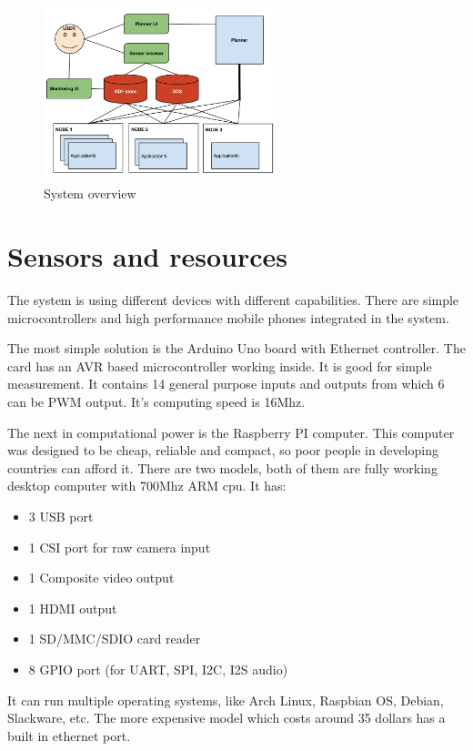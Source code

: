 \begin{figure}[h]
	\centering
	\includegraphics[width=0.6\textwidth]{figures/sysarch.png}
	\caption{System overview\label{fig:sysover}}
\end{figure}

\section{Sensors and resources}
The system is using different devices with different capabilities. There are simple microcontrollers and high performance mobile phones integrated in the system. 

The most simple solution is the Arduino Uno board with Ethernet controller. The card has an AVR based microcontroller working inside. It is good for simple measurement. It contains 14 general purpose inputs and outputs from which 6 can be PWM output. It's computing speed is 16Mhz.

The next in computational power is the Raspberry PI computer. This computer was designed to be cheap, reliable and compact, so poor people in developing countries can afford it. There are two models, both of them are fully working desktop computer with 700Mhz ARM cpu. It has:
\begin{itemize}
	\item 3 USB port
	\item 1 CSI port for raw camera input
	\item 1 Composite video output
	\item 1 HDMI output
	\item 1 SD/MMC/SDIO card reader
	\item 8 GPIO port (for UART, SPI, I2C, I2S audio)
\end{itemize} 
 It can run multiple operating systems, like Arch Linux, Raspbian OS, Debian, Slackware, etc. The more expensive model which costs around 35 dollars has a built in ethernet port.  

